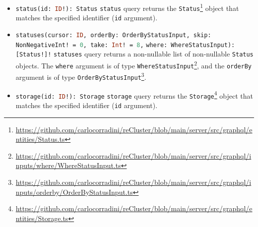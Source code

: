 \begin{itemize}
  \item \lstinline[language=graphql, morekeywords={[2]{Status}}, morekeywords={[4]{id}},
    morekeywords={[5]{status}}]{status(id: ID!): Status}
    \newline
    \texttt{status} query returns the \texttt{Status}\footnote{\url{https://github.com/carlocorradini/reCluster/blob/main/server/src/graphql/entities/Status.ts}}
    object that matches the specified identifier (\texttt{id} argument).

  \item \lstinline[language=graphql, morekeywords={[2]{Status, OrderByStatusInput, NonNegativeInt, WhereStatusInput}},
    morekeywords={[4]{cursor, orderBy, skip, take, where}}, morekeywords={[5]{statuses}}]{statuses(cursor: ID, orderBy: OrderByStatusInput, skip: NonNegativeInt! = 0, take: Int! = 8,}
    \newline
    \hphantom{---------------}\lstinline[language=graphql, morekeywords={[2]{Status, OrderByStatusInput, NonNegativeInt, WhereStatusInput}},
    morekeywords={[4]{cursor, orderBy, skip, take, where}}, morekeywords={[5]{statuses}}]{where: WhereStatusInput): [Status!]!}
    \newline
    \texttt{statuses} query returns a non-nullable list of non-nullable \texttt{Status}
    objects.
    \newline
    The \texttt{where} argument is of type \texttt{WhereStatusInput}\footnote{\url{https://github.com/carlocorradini/reCluster/blob/main/server/src/graphql/inputs/where/WhereStatusInput.ts}},
    and the \texttt{orderBy} argument is of type \texttt{OrderByStatusInput}\footnote{\url{https://github.com/carlocorradini/reCluster/blob/main/server/src/graphql/inputs/orderby/OrderByStatusInput.ts}}.

  \item \lstinline[language=graphql, morekeywords={[2]{Storage}}, morekeywords={[4]{id}},
    morekeywords={[5]{storage}}]{storage(id: ID!): Storage}
    \newline
    \texttt{storage} query returns the \texttt{Storage}\footnote{\url{https://github.com/carlocorradini/reCluster/blob/main/server/src/graphql/entities/Storage.ts}}
    object that matches the specified identifier (\texttt{id} argument).


\end{itemize}
